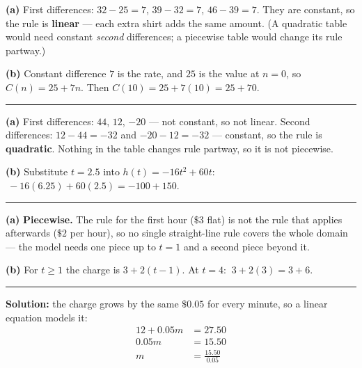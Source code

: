 \documentclass[12pt]{article}
\begin{document}



\textbf{(a)} First differences: $32 - 25 = 7$, $39 - 32 = 7$, $46 - 39 = 7$. They are constant, so the rule is \textbf{linear} --- each extra shirt adds the same amount. (A quadratic table would need constant \emph{second} differences; a piecewise table would change its rule partway.)

\textbf{(b)} Constant difference $7$ is the rate, and $25$ is the value at $n = 0$, so $C(n) = 25 + 7n$. Then $C(10) = 25 + 7(10) = 25 + 70$. 

\vspace{0.2cm}\noindent\rule{\linewidth}{0.2pt}


\textbf{(a)} First differences: $44$, $12$, $-20$ --- not constant, so not linear. Second differences: $12 - 44 = -32$ and $-20 - 12 = -32$ --- constant, so the rule is \textbf{quadratic}. Nothing in the table changes rule partway, so it is not piecewise.

\textbf{(b)} Substitute $t = 2.5$ into $h(t) = -16t^2 + 60t$: $\ -16(6.25) + 60(2.5) = -100 + 150$. 

\vspace{0.2cm}\noindent\rule{\linewidth}{0.2pt}


\textbf{(a)} \textbf{Piecewise.} The rule for the first hour ($\$3$ flat) is not the rule that applies afterwards ($\$2$ per hour), so no single straight-line rule covers the whole domain --- the model needs one piece up to $t = 1$ and a second piece beyond it.

\textbf{(b)} For $t \ge 1$ the charge is $3 + 2(t - 1)$. At $t = 4$: $\ 3 + 2(3) = 3 + 6$. 

\vspace{0.2cm}\noindent\rule{\linewidth}{0.2pt}


\textbf{Solution:} the charge grows by the same $\$0.05$ for every minute, so a linear equation models it:
\begin{align*}
  12 + 0.05m &= 27.50 \\
  0.05m &= 15.50 \\
  m &= \frac{15.50}{0.05}
\end{align*}
\end{document}
